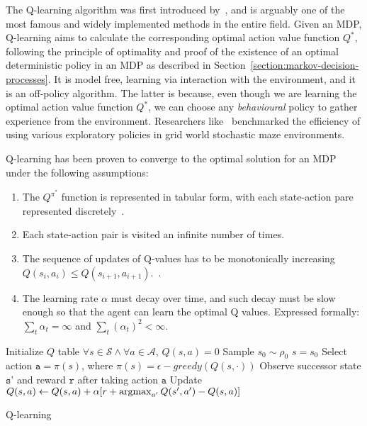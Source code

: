 \documentclass{../main.tex}{subfiles}
\newcommand{\var}{\texttt}
\begin{document}
The Q-learning algorithm was first introduced by~\cite{Watkins1989}, and is arguably one of the most famous and widely implemented methods in the entire field. Given an MDP, Q-learning aims to calculate the corresponding optimal action value function $Q^*$, following the principle of optimality and proof of the existence of an optimal deterministic policy in an MDP as described in Section~\ref{section:markov-decision-processes}. It is model free, learning via interaction with the environment, and it is an off-policy algorithm. The latter is because, even though we are learning the optimal action value function $Q^*$, we can choose any \textit{behavioural} policy to gather experience from the environment. Researchers like~\cite{Tijsma2017} benchmarked the efficiency of using various exploratory policies in grid world stochastic maze environments.

Q-learning has been proven to converge to the optimal solution for an MDP under the following assumptions:
\begin{enumerate}
    \item The $Q^{\pi^*}$ function is represented in tabular form, with each state-action pare represented discretely~\cite{Watkins1992}. 
    \item Each state-action pair is visited an infinite number of times.~\citep{Watkins1989}
    \item The sequence of updates of Q-values has to be monotonically increasing  $Q(s_i, a_i) \leq Q(s_{i+1}, a_{i+1})$.~\citep{Thrun1993}.
    \item The learning rate $\alpha$  must decay over time, and such decay must be slow enough so that the agent can learn the optimal Q values. Expressed formally: $\sum_{t} \alpha_t = \infty$ and $\sum_{t} {(\alpha_{t})}^{2} < \infty$.~\citep{Watkins1989}
\end{enumerate}
  
\begin{algorithm}
    Initialize $Q$ table $\forall s \in \mathcal{S} \wedge \forall a \in \mathcal{A}$, $Q(s,a) = 0$ \;
    Sample $s_0 \sim \rho_0$ \; 
    $s = s_0$ \;
 {
    Select action $\var{a} = \pi(s)$, where $\pi(s) = \epsilon-greedy(Q(s, \cdot))$ \;
    Observe successor state $\var{s'}$ and reward $\var{r}$ after taking action $\var{a}$ \;
    Update $Q(s,a) \leftarrow Q(s,a) + \alpha[r + \operatorname*{argmax}_{a'} Q(s', a') - Q(s,a)]$ \;
}
\caption{Q-learning}
\end{algorithm}
\end{document}
